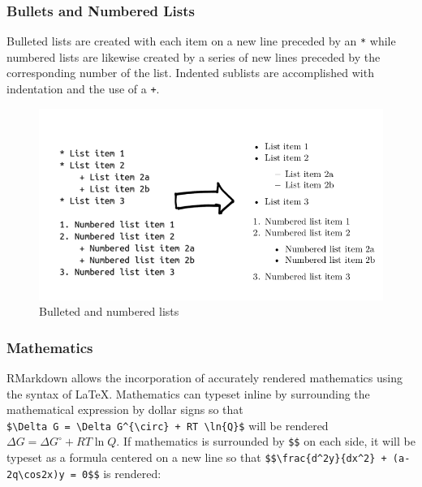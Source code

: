 \documentclass[]{elsarticle} %
\begin{document}
\hypertarget{bullets-and-numbered-lists}{%
\subsubsection{Bullets and Numbered
Lists}\label{bullets-and-numbered-lists}}

Bulleted lists are created with each item on a new line preceded by an
\texttt{*} while numbered lists are likewise created by a series of new
lines preceded by the corresponding number of the list. Indented
sublists are accomplished with indentation and the use of a \texttt{+}.

\begin{figure}[H]

{\centering \includegraphics[width=0.9\linewidth,]{Figures/Figure3} 

}

\caption{Bulleted and numbered lists}\label{fig:fig3}
\end{figure}

\hypertarget{mathematics}{%
\subsubsection{Mathematics}\label{mathematics}}

RMarkdown allows the incorporation of accurately rendered mathematics
using the syntax of LaTeX. Mathematics can typeset inline by surrounding
the mathematical expression by dollar signs so that
\texttt{\$\textbackslash{}Delta\ G\ =\ \textbackslash{}Delta\ G\^{}\{\textbackslash{}circ\}\ +\ RT\ \textbackslash{}ln\{Q\}\$}
will be rendered \(\Delta G = \Delta G^{\circ} + RT \ln{Q}\). If
mathematics is surrounded by \texttt{\$\$} on each side, it will be
typeset as a formula centered on a new line so that
\texttt{\$\$\textbackslash{}frac\{d\^{}2y\}\{dx\^{}2\}\ +\ (a-2q\textbackslash{}cos2x)y\ =\ 0\$\$}
is rendered:
\end{document}
